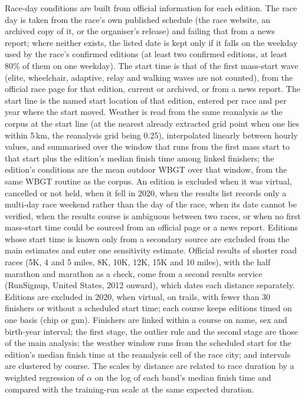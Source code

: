 \documentclass[11pt]{article}
\renewcommand{\_}{\textunderscore\allowbreak}
\begin{document}
Race-day conditions are built from official information for each edition. The race day is taken from the race's own published schedule (the race website, an archived copy of it, or the organiser's release) and failing that from a news report; where neither exists, the listed date is kept only if it falls on the weekday used by the race's confirmed editions (at least two confirmed editions, at least 80\% of them on one weekday). The start time is that of the first mass-start wave (elite, wheelchair, adaptive, relay and walking waves are not counted), from the official race page for that edition, current or archived, or from a news report. The start line is the named start location of that edition, entered per race and per year where the start moved. Weather is read from the same reanalysis as the corpus at the start line (at the nearest already extracted grid point when one lies within 5\,km, the reanalysis grid being 0.25\textdegree), interpolated linearly between hourly values, and summarised over the window that runs from the first mass start to that start plus the edition's median finish time among linked finishers; the edition's conditions are the mean outdoor WBGT over that window, from the same WBGT routine as the corpus. An edition is excluded when it was virtual, cancelled or not held, when it fell in 2020, when the results list records only a multi-day race weekend rather than the day of the race, when its date cannot be verified, when the results course is ambiguous between two races, or when no first mass-start time could be sourced from an official page or a news report. Editions whose start time is known only from a secondary source are excluded from the main estimates and enter one sensitivity estimate. Official results of shorter road races (5K, 4 and 5 miles, 8K, 10K, 12K, 15K and 10 miles), with the half marathon and marathon as a check, come from a second results service (RunSignup, United States, 2012 onward), which dates each distance separately. Editions are excluded in 2020, when virtual, on trails, with fewer than 30 finishers or without a scheduled start time; each course keeps editions timed on one basis (chip or gun). Finishers are linked within a course on name, sex and birth-year interval; the first stage, the outlier rule and the second stage are those of the main analysis; the weather window runs from the scheduled start for the edition's median finish time at the reanalysis cell of the race city; and intervals are clustered by course. The scales by distance are related to race duration by a weighted regression of $\alpha$ on the log of each band's median finish time and compared with the training-run scale at the same expected duration.
\end{document}
